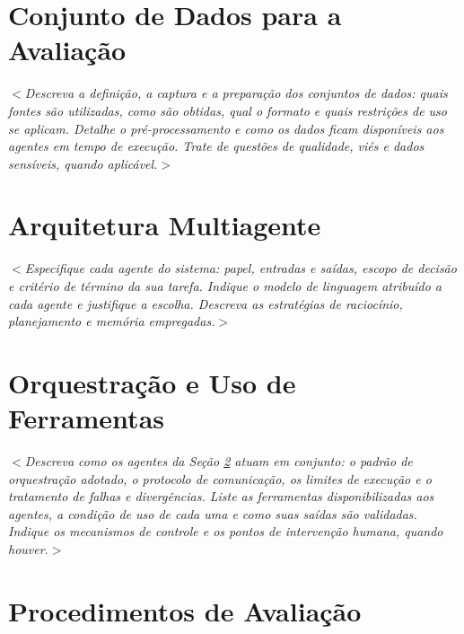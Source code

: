 \documentclass[12pt]{article}
\begin{document}
\section{Conjunto de Dados para a Avaliação}
\label{sec:dados}

\textit{$<$Descreva a definição, a captura e a preparação dos conjuntos de dados: quais fontes são utilizadas, como são obtidas, qual o formato e quais restrições de uso se aplicam. Detalhe o pré-processamento e como os dados ficam disponíveis aos agentes em tempo de execução. Trate de questões de qualidade, viés e dados sensíveis, quando aplicável.$>$} %

\section{Arquitetura Multiagente}
\label{sec:arquitetura}

\textit{$<$Especifique cada agente do sistema: papel, entradas e saídas, escopo de decisão e critério de término da sua tarefa. Indique o modelo de linguagem atribuído a cada agente e justifique a escolha. Descreva as estratégias de raciocínio, planejamento e memória empregadas.$>$}

\section{Orquestração e Uso de Ferramentas}
\label{sec:orquestracao}

\textit{$<$Descreva como os agentes da Seção \ref{sec:arquitetura} atuam em conjunto: o padrão de orquestração adotado, o protocolo de comunicação, os limites de execução e o tratamento de falhas e divergências. Liste as ferramentas disponibilizadas aos agentes, a condição de uso de cada uma e como suas saídas são validadas. Indique os mecanismos de controle e os pontos de intervenção humana, quando houver.$>$}

\section{Procedimentos de Avaliação}
\label{sec:avaliacao}
\end{document}
